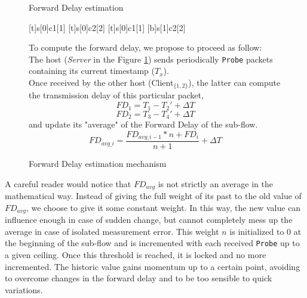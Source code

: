 \documentclass[11pt,a4paper,oldfontcommands]{memoir}
\begin{document}
\begin{figure}[!h]
\begin{minipage}[c]{.55\linewidth}
\begin{msc}[r]{Forward Delay estimation}

\setlength{\instfootheight}{0em}
\setlength{\instheadheight}{0em}
\setlength{\instdist}{0.25\linewidth}
\setlength{\levelheight}{3em}


[t]{s}[0]{c1}[1]
\nextlevel
{}[t]{s}[0]{c2}[2]
\nextlevel
{}[t]{s}[0]{c1}[1]
[b]{s}[1]{c2}[2]
\nextlevel
{}
\nextlevel
{}
\nextlevel
\end{msc}
\caption{Forward Delay estimation mechanism}
\label{fig:forwardDelayComputation}
\end{minipage}
\begin{minipage}[c]{.44\linewidth}
To compute the forward delay, we propose to proceed as follow:\\

The host (\textit{Server} in the Figure \ref{fig:forwardDelayComputation}) sends periodically \verb!Probe! packets containing its current timestamp ($T_x$).\\

Once received by the other host (Client$_{\{1,2\}}$), the latter can compute the transmission delay of this particular packet,
$$FD_1 = T_1 - T_2' + \Delta{}T$$
$$FD_2 = T_3 - T_4' + \Delta{}T$$
and update its "average" of the Forward Delay of the sub-flow.
$$FD_{avg\_i} = \frac{FD_{avg\_i-1} * n + FD_i}{n + 1} + \Delta T$$
\end{minipage}
\end{figure}

A careful reader would notice that $FD_{avg}$ is not strictly an average in the mathematical way. Instead of giving the full weight of its past to the old value of $FD_{avg}$, we choose to give it some constant weight. In this way, the new value can influence enough in case of sudden change, but cannot completely mess up the average in case of isolated measurement error. This weight $n$ is initialized to 0 at the beginning of the sub-flow and is incremented with each received \verb!Probe! up to a given ceiling. Once this threshold is reached, it is locked and no more incremented. The historic value gains momentum up to a certain point, avoiding to overcome changes in the forward delay and to be too sensible to quick variations.
\end{document}
